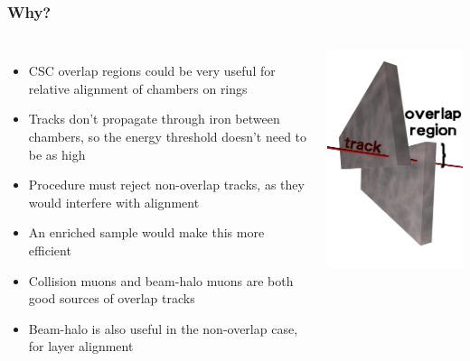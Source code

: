 \documentclass[compress]{beamer}
\begin{document}
\begin{frame}
\frametitle{Why?}

\begin{columns}
\begin{itemize}\setlength{\itemsep}{0.1 cm}
\item CSC overlap regions could be very useful for relative alignment
of chambers on rings
\item Tracks don't propagate through iron between chambers, so the
energy threshold doesn't need to be as high
\item Procedure must reject non-overlap tracks, as they would
interfere with alignment
\item An enriched sample would make this more efficient
\item Collision muons and beam-halo muons are both good sources of
overlap tracks
\item Beam-halo is also useful in the non-overlap case, for layer
alignment
\end{itemize}

\includegraphics[width=\linewidth]{overlap.png}
\end{columns}
\end{frame}
\end{document}
